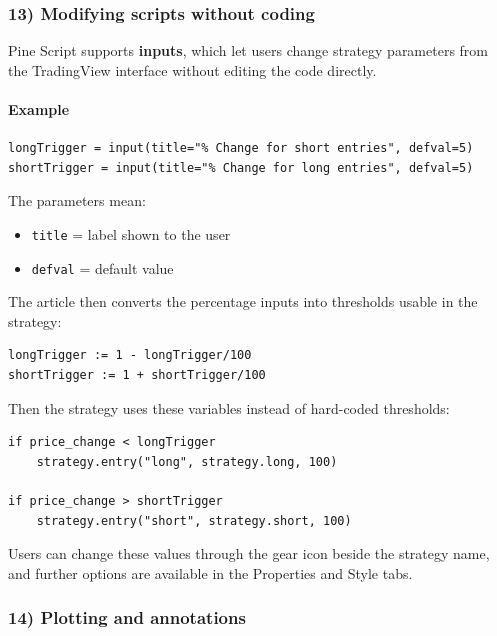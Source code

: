 \documentclass[12pt,openany]{book}
\begin{document}
\subsubsection{13) Modifying scripts without coding}

Pine Script supports \textbf{inputs}, which let users change strategy parameters from the TradingView interface without editing the code directly.

\paragraph{Example}

\begin{Verbatim}[breaklines=true,breakanywhere=true,fontsize=\small]
longTrigger = input(title="% Change for short entries", defval=5)
shortTrigger = input(title="% Change for long entries", defval=5)
\end{Verbatim}

The parameters mean:

\begin{itemize}[leftmargin=*]
    \item \texttt{title} = label shown to the user
    \item \texttt{defval} = default value
\end{itemize}

The article then converts the percentage inputs into thresholds usable in the strategy:

\begin{Verbatim}[breaklines=true,breakanywhere=true,fontsize=\small]
longTrigger := 1 - longTrigger/100
shortTrigger := 1 + shortTrigger/100
\end{Verbatim}

Then the strategy uses these variables instead of hard-coded thresholds:

\begin{Verbatim}[breaklines=true,breakanywhere=true,fontsize=\small]
if price_change < longTrigger
    strategy.entry("long", strategy.long, 100)

if price_change > shortTrigger
    strategy.entry("short", strategy.short, 100)
\end{Verbatim}

Users can change these values through the gear icon beside the strategy name, and further options are available in the Properties and Style tabs.

\subsubsection{14) Plotting and annotations}
\end{document}
